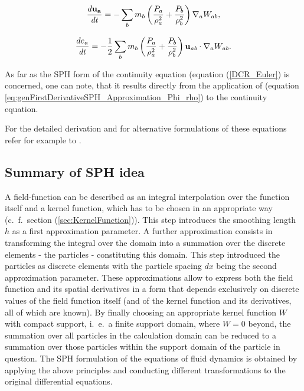 \documentclass{report}
\begin{document}
\begin{equation}
\label{eq:VCR_Euler}
\frac{ d {\bf u_{a}}}{\mathit{dt}}=-\sum_b {m_{b}\left(\frac{P_{a}}{\rho_{a}^{2}}+\frac{P_{b}}{\rho _{b}^{2}}\right)\nabla_{a}W_{ab}},
\end{equation}


\begin{equation}
\label{eq:ECR_Euler}
\frac{de_{a}}{\mathit{dt}}=-\mathit{}\frac{1}{2}\sum_b{m_{b}\left(\frac{P_{a}}{\rho _{a}^{2}}+\frac{P_{b}}{\rho _{b}^{2}}\right){\bf u_{\mathit{ab}}}\cdot\nabla _{a}W_{\mathit{ab}}}.
\end{equation}

As far as the SPH form of the continuity equation (equation (\ref{DCR_Euler}) is concerned, one can note, that it results directly from the application of (equation \ref{eq:genFirstDerivativeSPH_Approximation_Phi_rho}) to the continuity equation.

For the detailed derivation and for alternative formulations of
these equations refer for example to \cite{Monaghan2005, Liu2003}.

\subsection{Summary of SPH idea}
A field-function can be
described as an integral interpolation over the function itself and a kernel
function, which has to be chosen in an appropriate way (c.\ f.\ section (\ref{sec:KernelFunction})). This step introduces the smoothing length $h$ as a first approximation parameter. A further
approximation consists in transforming the integral over the domain into a
summation over the discrete elements - the particles - constituting this domain. This step introduced the particles as discrete elements with the particle spacing $dx$ being the second approximation parameter. 
These approximations allow to express both the field function and its spatial derivatives in a form that depends exclusively on discrete values
of the field function itself (and of the kernel function and its derivatives, 
all of which are known). By finally choosing an appropriate kernel function $W$ with compact support, i.\ e.\ a finite support domain, where $W=0$ beyond, the summation over all particles in the calculation domain can be reduced
to a summation over those particles within the support domain of the particle
in question.
The SPH formulation of the equations of fluid
dynamics is obtained by applying the above principles and conducting different
transformations to the original differential equations. 
\end{document}
